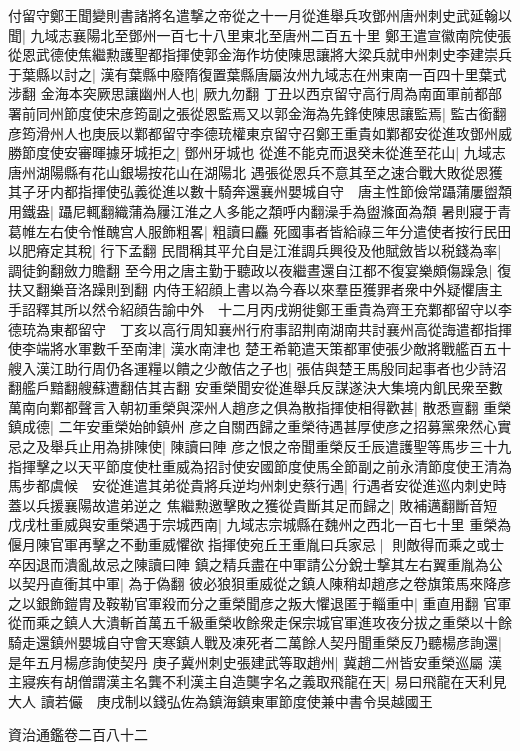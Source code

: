 付留守鄭王聞變則書諸將名遣撃之帝從之十一月從進舉兵攻鄧州唐州刺史武延翰以聞|{
	九域志襄陽北至鄧州一百七十八里東北至唐州二百五十里}
鄭王遣宣徽南院使張從恩武德使焦繼勲護聖都指揮使郭金海作坊使陳思讓將大梁兵就申州刺史李建崇兵于葉縣以討之|{
	漢有葉縣中廢隋復置葉縣唐屬汝州九域志在州東南一百四十里葉式涉翻}
金海本突厥思讓幽州人也|{
	厥九勿翻}
丁丑以西京留守高行周為南面軍前都部署前同州節度使宋彦筠副之張從恩監焉又以郭金海為先鋒使陳思讓監焉|{
	監古銜翻}
彦筠滑州人也庚辰以鄴都留守李德珫權東京留守召鄭王重貴如鄴都安從進攻鄧州威勝節度使安審暉據牙城拒之|{
	鄧州牙城也}
從進不能克而退癸未從進至花山|{
	九域志唐州湖陽縣有花山銀場按花山在湖陽北}
遇張從恩兵不意其至之速合戰大敗從恩獲其子牙内都指揮使弘義從進以數十騎奔還襄州嬰城自守　唐主性節儉常躡蒲屢盥頮用鐵盎|{
	躡尼輒翻織蒲為屨江淮之人多能之頮呼内翻澡手為盥滌面為頮}
暑則寢于青葛帷左右使令惟醜宫人服飾粗畧|{
	粗讀曰麤}
死國事者皆給祿三年分遣使者按行民田以肥瘠定其稅|{
	行下孟翻}
民間稱其平允自是江淮調兵興役及他賦斂皆以税錢為率|{
	調徒鉤翻斂力贍翻}
至今用之唐主勤于聽政以夜繼晝還自江都不復宴樂頗傷躁急|{
	復扶又翻樂音洛躁則到翻}
内侍王紹顔上書以為今春以來羣臣獲罪者衆中外疑懼唐主手詔釋其所以然令紹顔告諭中外　十二月丙戌朔徙鄭王重貴為齊王充鄴都留守以李德珫為東都留守　丁亥以高行周知襄州行府事詔荆南湖南共討襄州高從誨遣都指揮使李端將水軍數千至南津|{
	漢水南津也}
楚王希範遣天策都軍使張少敵將戰艦百五十艘入漢江助行周仍各運糧以饋之少敵佶之子也|{
	張佶與楚王馬殷同起事者也少詩沼翻艦戶黯翻艘蘇遭翻佶其吉翻}
安重榮聞安從進舉兵反謀遂決大集境内飢民衆至數萬南向鄴都聲言入朝初重榮與深州人趙彦之俱為散指揮使相得歡甚|{
	散悉亶翻}
重榮鎮成德|{
	二年安重榮始帥鎮州}
彦之自關西歸之重榮待遇甚厚使彦之招募黨衆然心實忌之及舉兵止用為排陳使|{
	陳讀曰陣}
彦之恨之帝聞重榮反壬辰遣護聖等馬步三十九指揮擊之以天平節度使杜重威為招討使安國節度使馬全節副之前永清節度使王清為馬步都虞候　安從進遣其弟從貴將兵逆均州刺史蔡行遇|{
	行遇者安從進巡内刺史時蓋以兵援襄陽故遣弟逆之}
焦繼勲邀擊敗之獲從貴斷其足而歸之|{
	敗補邁翻斷音短}
戊戌杜重威與安重榮遇于宗城西南|{
	九域志宗城縣在魏州之西北一百七十里}
重榮為偃月陳官軍再擊之不動重威懼欲指揮使宛丘王重胤曰兵家忌|{
	則敵得而乘之或士卒因退而潰亂故忌之陳讀曰陣}
鎮之精兵盡在中軍請公分銳士撃其左右翼重胤為公以契丹直衝其中軍|{
	為于偽翻}
彼必狼狽重威從之鎮人陳稍却趙彦之卷旗策馬來降彦之以銀飾鎧胄及鞍勒官軍殺而分之重榮聞彦之叛大懼退匿于輜重中|{
	重直用翻}
官軍從而乘之鎮人大潰斬首萬五千級重榮收餘衆走保宗城官軍進攻夜分拔之重榮以十餘騎走還鎮州嬰城自守會天寒鎮人戰及凍死者二萬餘人契丹聞重榮反乃聽楊彦詢還|{
	是年五月楊彦詢使契丹}
庚子冀州刺史張建武等取趙州|{
	冀趙二州皆安重榮巡屬}
漢主寢疾有胡僧謂漢主名龔不利漢主自造龑字名之義取飛龍在天|{
	易曰飛龍在天利見大人}
讀若儼　庚戌制以錢弘佐為鎮海鎮東軍節度使兼中書令吳越國王

資治通鑑卷二百八十二
